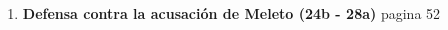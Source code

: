 \begin{multicols}{2}
\begin{enumerate}[\bfseries 1.]
    \item \textbf{Defensa contra la acusación de Meleto (24b - 28a)}
	pagina 52

    \end{enumerate}

\end{multicols}
